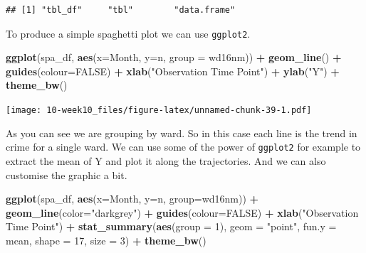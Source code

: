 \documentclass[]{book}
\newenvironment{Shaded}{\begin{snugshade}}{\end{snugshade}}
\newcommand{\DataTypeTok}[1]{\textcolor[rgb]{0.13,0.29,0.53}{#1}}
\newcommand{\DecValTok}[1]{\textcolor[rgb]{0.00,0.00,0.81}{#1}}
\newcommand{\KeywordTok}[1]{\textcolor[rgb]{0.13,0.29,0.53}{\textbf{#1}}}
\newcommand{\NormalTok}[1]{#1}
\newcommand{\OperatorTok}[1]{\textcolor[rgb]{0.81,0.36,0.00}{\textbf{#1}}}
\newcommand{\OtherTok}[1]{\textcolor[rgb]{0.56,0.35,0.01}{#1}}
\newcommand{\StringTok}[1]{\textcolor[rgb]{0.31,0.60,0.02}{#1}}
\begin{document}
\begin{verbatim}
## [1] "tbl_df"     "tbl"        "data.frame"
\end{verbatim}

To produce a simple spaghetti plot we can use \texttt{ggplot2}.

\begin{Shaded}
\begin{Highlighting}[]
\KeywordTok{ggplot}\NormalTok{(spa_df, }\KeywordTok{aes}\NormalTok{(}\DataTypeTok{x=}\NormalTok{Month, }\DataTypeTok{y=}\NormalTok{n, }\DataTypeTok{group =}\NormalTok{ wd16nm)) }\OperatorTok{+}\StringTok{ }
\StringTok{  }\KeywordTok{geom_line}\NormalTok{() }\OperatorTok{+}\StringTok{ }\KeywordTok{guides}\NormalTok{(}\DataTypeTok{colour=}\OtherTok{FALSE}\NormalTok{) }\OperatorTok{+}\StringTok{ }\KeywordTok{xlab}\NormalTok{(}\StringTok{"Observation Time Point"}\NormalTok{) }\OperatorTok{+}
\StringTok{  }\KeywordTok{ylab}\NormalTok{(}\StringTok{"Y"}\NormalTok{) }\OperatorTok{+}
\StringTok{  }\KeywordTok{theme_bw}\NormalTok{()}
\end{Highlighting}
\end{Shaded}

\texttt{[image: 10-week10\_files/figure-latex/unnamed-chunk-39-1.pdf]}

As you can see we are grouping by ward. So in this case each line is the trend in crime for a single ward. We can use some of the power of \texttt{ggplot2} for example to extract the mean of Y and plot it along the trajectories. And we can also customise the graphic a bit.

\begin{Shaded}
\begin{Highlighting}[]
\KeywordTok{ggplot}\NormalTok{(spa_df, }\KeywordTok{aes}\NormalTok{(}\DataTypeTok{x=}\NormalTok{Month, }\DataTypeTok{y=}\NormalTok{n, }\DataTypeTok{group=}\NormalTok{wd16nm)) }\OperatorTok{+}\StringTok{ }
\StringTok{  }\KeywordTok{geom_line}\NormalTok{(}\DataTypeTok{color=}\StringTok{"darkgrey"}\NormalTok{) }\OperatorTok{+}\StringTok{ }\KeywordTok{guides}\NormalTok{(}\DataTypeTok{colour=}\OtherTok{FALSE}\NormalTok{) }\OperatorTok{+}\StringTok{ }\KeywordTok{xlab}\NormalTok{(}\StringTok{"Observation Time Point"}\NormalTok{) }\OperatorTok{+}\StringTok{ }
\StringTok{  }\KeywordTok{stat_summary}\NormalTok{(}\KeywordTok{aes}\NormalTok{(}\DataTypeTok{group =} \DecValTok{1}\NormalTok{), }\DataTypeTok{geom =} \StringTok{"point"}\NormalTok{, }\DataTypeTok{fun.y =}\NormalTok{ mean, }\DataTypeTok{shape =} \DecValTok{17}\NormalTok{, }\DataTypeTok{size =} \DecValTok{3}\NormalTok{) }\OperatorTok{+}
\StringTok{  }\KeywordTok{theme_bw}\NormalTok{()}
\end{Highlighting}
\end{Shaded}
\end{document}
